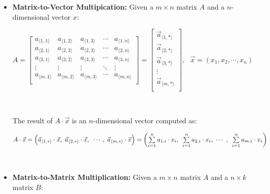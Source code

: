 \begin{tcolorbox}[title={\textbf{\tboxdef{\ref*{subsec:matrix-arithmetic}} Matrix Arithmetic}}]

\begin{itemize}
\item \textbf{Matrix-to-Vector Multipication:} Given a $m \times n$ matrix $A$ and a $n$-dimensional vector $x$: 


$A = \begin{bmatrix}
 a_{\langle 1, 1\rangle} & a_{\langle 1, 2\rangle} & a_{\langle 1, 3\rangle} & \cdots & a_{\langle 1, n\rangle}\\
 a_{\langle 2, 1\rangle} & a_{\langle 2, 2\rangle} & a_{\langle 2, 3\rangle} & \cdots & a_{\langle 2, n\rangle} \\
 a_{\langle 3, 1\rangle} & a_{\langle 3, 2\rangle} & a_{\langle 3, 3\rangle} & \cdots & a_{\langle 3, n\rangle} \\
\vdots & \vdots & \vdots & \ddots & \vdots \\
 a_{\langle m, 1\rangle} & a_{\langle m, 2\rangle} & a_{\langle m, 3\rangle} & \cdots & a_{\langle m, n\rangle} \\
\end{bmatrix} = \begin{bmatrix} 
\vec{a}_{\langle 1, * \rangle} \\ 
\vec{a}_{\langle 2, * \rangle} \\ 
\vec{a}_{\langle 3, * \rangle} \\ 
\vdots\\
\vec{a}_{\langle m, * \rangle} \\ 
\end{bmatrix}, \text{ } \vec{x} = (x_1, x_2, \cdots, x_{n})$


$ $

The result of $A \cdot \vec{x}$ is an $n$-dimensional vector computed as:

$A \cdot \vec{x} = \Big(\vec{a}_{\langle 1, * \rangle} \cdot \vec{x}, \text{ } \vec{a}_{\langle 2, * \rangle} \cdot \vec{x}, \text{ }\cdots,\text{ } \vec{a}_{\langle m, * \rangle} \cdot \vec{x} \Big) = \left(\sum\limits_{i=1}^{n} a_{1, i} \cdot  x_i, \text{ } \sum\limits_{i=1}^{n}  a_{2, i} \cdot x_i, \text{ } \text{$\cdots$} \text{ }, \text{ } \sum\limits_{i=1}^{n} a_{m, i} \cdot x_i \right)$


$ $


\item \textbf{Matrix-to-Matrix Multiplication:} Given a $m \times n$ matrix $A$ and a $n \times k$ matrix $B$: 




\end{itemize}
\end{tcolorbox}

